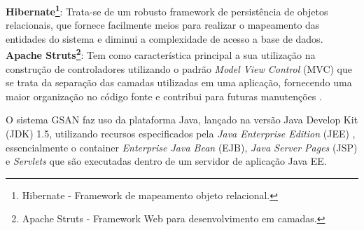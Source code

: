 \textbf{Hibernate\footnote{Hibernate - Framework de mapeamento objeto relacional.}}: Trata-se de um robusto framework de persistência de objetos relacionais, que fornece facilmente meios para realizar o mapeamento das entidades do sistema e diminui a complexidade de acesso a base de dados.\\

\textbf{Apache Struts\footnote{Apache Struts - Framework Web para desenvolvimento em camadas.}}: Tem como característica principal a sua utilização na construção de controladores utilizando o padrão \textit{Model View Control} (MVC) que se trata da separação das camadas utilizadas em uma aplicação, fornecendo uma maior organização no código fonte e contribui para futuras manutenções \cite{fowler2003}. 

O sistema GSAN faz uso da plataforma Java, lançado na versão Java Develop Kit (JDK) 1.5, utilizando recursos especificados pela \textit{Java Enterprise Edition} (JEE) \cite{PORTAL:2014}, essencialmente o container \textit{Enterprise Java Bean} (EJB), \textit{Java Server Pages }(JSP) e \textit{Servlets} que são executadas dentro de um servidor de aplicação Java EE.

